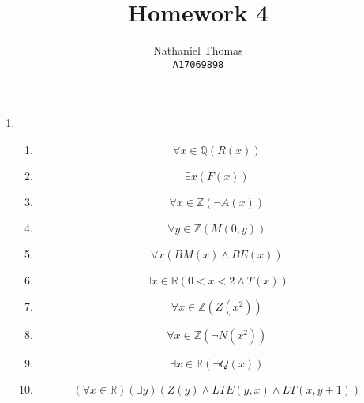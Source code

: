 \documentclass{article}
\title{Homework 4}
\author{
	Nathaniel Thomas\\
	\texttt{A17069898}
}
\newcommand{\R}{\mathbb{R}}
\newcommand{\Z}{\mathbb{Z}}
\newcommand{\Q}{\mathbb{Q}}
\begin{document}
\maketitle
\begin{enumerate}
	\item \begin{enumerate}
		      \item $$
			            \forall x \in \Q (R(x))
		            $$

		      \item $$
			            \exists x (F(x))
		            $$

		      \item $$
			            \forall x \in \Z (\lnot A(x))
		            $$

		      \item $$
			            \forall y \in \Z (M(0,y))
		            $$

		      \item $$
			            \forall x (BM(x) \land BE(x))
		            $$

		      \item $$
			            \exists x \in \R (0 < x < 2 \land T(x))
		            $$

		      \item $$
			            \forall x \in \Z (Z(x^2))
		            $$

		      \item $$
			            \forall x \in \Z (\lnot N(x^2))
		            $$

		      \item $$
			            \exists x \in \R (\lnot Q(x))
		            $$

		      \item $$
			            (\forall x \in \R)(\exists y)(Z(y) \land LTE(y,x) \land LT(x, y+1))
		            $$
	      \end{enumerate}


\end{enumerate}
\end{document}
